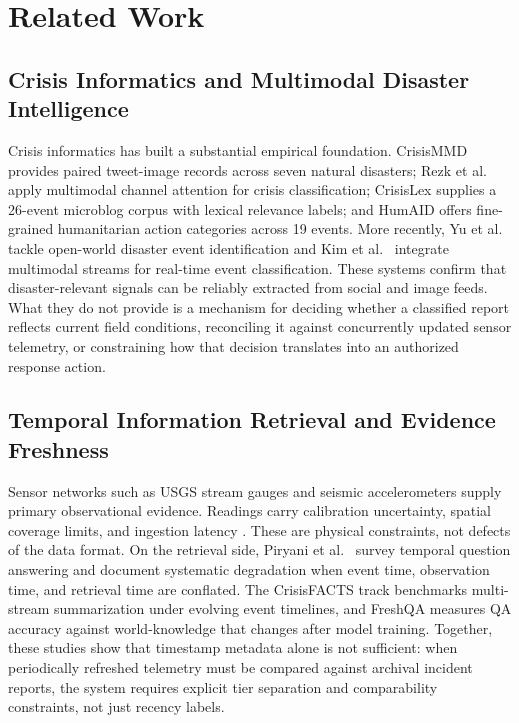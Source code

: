 \documentclass[conference]{IEEEtran}
\begin{document}
\section{Related Work}
\subsection{Crisis Informatics and Multimodal Disaster Intelligence}
Crisis informatics has built a substantial empirical foundation. CrisisMMD \cite{crisismmd} provides paired tweet-image records across seven natural disasters; Rezk et al.\ \cite{rezk2023} apply multimodal channel attention for crisis classification; CrisisLex \cite{olteanu2014} supplies a 26-event microblog corpus with lexical relevance labels; and HumAID \cite{humaid} offers fine-grained humanitarian action categories across 19 events. More recently, Yu et al.\ \cite{yu2025} tackle open-world disaster event identification and Kim et al.\ \cite{kim2025} integrate multimodal streams for real-time event classification. These systems confirm that disaster-relevant signals can be reliably extracted from social and image feeds. What they do not provide is a mechanism for deciding whether a classified report reflects current field conditions, reconciling it against concurrently updated sensor telemetry, or constraining how that decision translates into an authorized response action.

\subsection{Temporal Information Retrieval and Evidence Freshness}
Sensor networks such as USGS stream gauges and seismic accelerometers supply primary observational evidence. Readings carry calibration uncertainty, spatial coverage limits, and ingestion latency \cite{manuel2024}. These are physical constraints, not defects of the data format. On the retrieval side, Piryani et al.\ \cite{piryani2023} survey temporal question answering and document systematic degradation when event time, observation time, and retrieval time are conflated. The CrisisFACTS track \cite{crisisfacts} benchmarks multi-stream summarization under evolving event timelines, and FreshQA \cite{freshqa} measures QA accuracy against world-knowledge that changes after model training. Together, these studies show that timestamp metadata alone is not sufficient: when periodically refreshed telemetry must be compared against archival incident reports, the system requires explicit tier separation and comparability constraints, not just recency labels.
\end{document}
